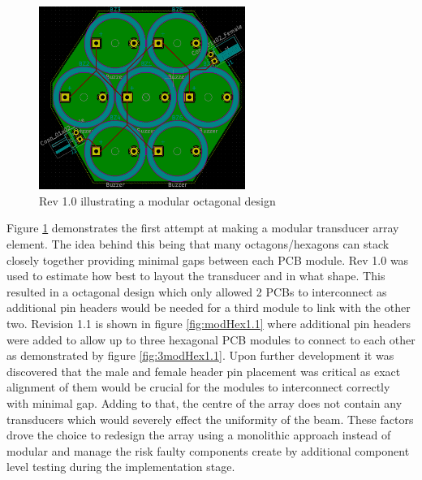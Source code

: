 \begin{figure}[ht!]
    \centering
    \includegraphics[width=0.6\textwidth]{Figures/Design/PCB/closeups/octogonalrev1.png}
    \caption{Rev 1.0 illustrating a modular octagonal design}
    \label{fig:modHex1.0}
\end{figure}
\newpage
Figure \ref{fig:modHex1.0} demonstrates the first attempt at making a modular transducer array element. The idea behind this being that many octagons/hexagons can stack closely together providing minimal gaps between each PCB module. Rev 1.0 was used to estimate how best to layout the transducer and in what shape. This resulted in a octagonal design which only allowed 2 PCBs to interconnect as additional pin headers would be needed for a third module to link with the other two.
Revision 1.1 is shown in figure \ref{fig:modHex1.1} where additional pin headers were added to allow up to three hexagonal PCB modules to connect to each other as demonstrated by figure \ref{fig:3modHex1.1}. Upon further development it was discovered that the male and female header pin placement was critical as exact alignment of them would be crucial for the modules to interconnect correctly with minimal gap. Adding to that, the centre of the array does not contain any transducers which would severely effect the uniformity of the beam. These factors drove the choice to redesign the array using a monolithic approach instead of modular and manage the risk faulty components create by additional component level testing during the implementation stage.

